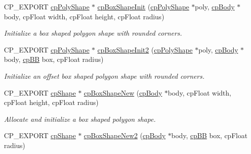 \begin{DoxyCompactItemize}
\item 
\mbox{\label{group__cpPolyShape_ga4ced4eb48b8eda28d02c786e7beb342c}} 
C\+P\+\_\+\+E\+X\+P\+O\+RT \hyperlink{structcpPolyShape}{cp\+Poly\+Shape} $\ast$ \hyperlink{group__cpPolyShape_ga4ced4eb48b8eda28d02c786e7beb342c}{cp\+Box\+Shape\+Init} (\hyperlink{structcpPolyShape}{cp\+Poly\+Shape} $\ast$poly, \hyperlink{structcpBody}{cp\+Body} $\ast$body, cp\+Float width, cp\+Float height, cp\+Float radius)
\begin{DoxyCompactList}\small\item\em Initialize a box shaped polygon shape with rounded corners. \end{DoxyCompactList}\item 
\mbox{\label{group__cpPolyShape_gad5e141e0797d2bdc81706ff997e7b40f}} 
C\+P\+\_\+\+E\+X\+P\+O\+RT \hyperlink{structcpPolyShape}{cp\+Poly\+Shape} $\ast$ \hyperlink{group__cpPolyShape_gad5e141e0797d2bdc81706ff997e7b40f}{cp\+Box\+Shape\+Init2} (\hyperlink{structcpPolyShape}{cp\+Poly\+Shape} $\ast$poly, \hyperlink{structcpBody}{cp\+Body} $\ast$body, \hyperlink{structcpBB}{cp\+BB} box, cp\+Float radius)
\begin{DoxyCompactList}\small\item\em Initialize an offset box shaped polygon shape with rounded corners. \end{DoxyCompactList}\item 
\mbox{\label{group__cpPolyShape_ga6bddb137a72db02c5e4c6144f298833c}} 
C\+P\+\_\+\+E\+X\+P\+O\+RT \hyperlink{structcpShape}{cp\+Shape} $\ast$ \hyperlink{group__cpPolyShape_ga6bddb137a72db02c5e4c6144f298833c}{cp\+Box\+Shape\+New} (\hyperlink{structcpBody}{cp\+Body} $\ast$body, cp\+Float width, cp\+Float height, cp\+Float radius)
\begin{DoxyCompactList}\small\item\em Allocate and initialize a box shaped polygon shape. \end{DoxyCompactList}\item 
\mbox{\label{group__cpPolyShape_gaadcbabea1c00f2427fe4d7a718a79270}} 
C\+P\+\_\+\+E\+X\+P\+O\+RT \hyperlink{structcpShape}{cp\+Shape} $\ast$ \hyperlink{group__cpPolyShape_gaadcbabea1c00f2427fe4d7a718a79270}{cp\+Box\+Shape\+New2} (\hyperlink{structcpBody}{cp\+Body} $\ast$body, \hyperlink{structcpBB}{cp\+BB} box, cp\+Float radius)

\end{DoxyCompactItemize}
